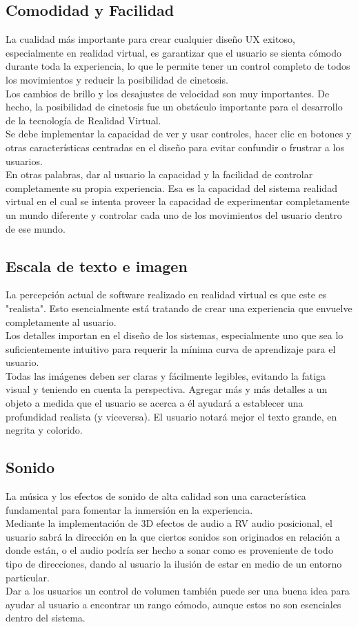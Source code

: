 \subsection{Comodidad y Facilidad}
La cualidad más importante para crear cualquier diseño UX exitoso, especialmente en realidad virtual, es garantizar que el usuario se sienta cómodo durante toda la experiencia\cite{antonya2007design},
 lo que le permite tener un control completo de todos los movimientos y reducir la posibilidad de cinetosis.\\
Los cambios de brillo y los desajustes de velocidad son muy importantes. De hecho, la posibilidad de cinetosis fue un obstáculo importante para el desarrollo de la tecnología de 
Realidad Virtual.\\
Se debe implementar la capacidad de ver y usar controles, hacer clic en botones y otras características centradas en el diseño para evitar confundir o frustrar a los usuarios.\\
En otras palabras, dar al usuario la capacidad y la facilidad de controlar completamente su propia experiencia. Esa es la capacidad del sistema realidad virtual en el cual se 
intenta proveer la capacidad de experimentar completamente un mundo diferente y controlar cada uno de los movimientos del usuario dentro de ese mundo.

\subsection{Escala de texto e imagen}
La percepción actual de software realizado en realidad virtual es que este es "realista". Esto esencialmente está tratando de crear una experiencia que envuelve completamente al usuario.\\
Los detalles importan en el diseño de los sistemas, especialmente uno que sea lo suficientemente intuitivo para requerir la mínima curva de aprendizaje para el usuario.\\
Todas las imágenes deben ser claras y fácilmente legibles, evitando la fatiga visual y teniendo en cuenta la perspectiva. Agregar más y más detalles a un objeto a medida 
que el usuario se acerca a él ayudará a establecer una profundidad realista (y viceversa). El usuario notará mejor el texto grande, en negrita y colorido.

\subsection{Sonido}
La música y los efectos de sonido de alta calidad son una característica fundamental para fomentar la inmersión en la experiencia.\\
Mediante la implementación de 3D efectos de audio a RV audio posicional, el usuario sabrá la dirección en la que ciertos sonidos son originados en relación a donde están, 
o el audio podría ser hecho a sonar como es proveniente de todo tipo de direcciones, dando al usuario la ilusión de estar en medio de un entorno particular.\\
Dar a los usuarios un control de volumen también puede ser una buena idea para ayudar al usuario a encontrar un rango cómodo, aunque estos no son esenciales dentro del sistema.

